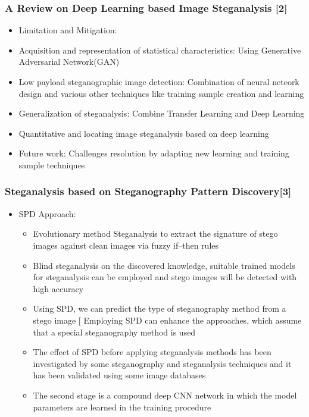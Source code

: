 \documentclass{beamer} %
\theoremstyle{definition} %
\begin{document}
\begin{frame}
\frametitle{A Review on Deep Learning based Image Steganalysis [2]   }
\begin{itemize}
	\item{Limitation and Mitigation:}
\end{itemize}
	\begin{itemize}
		\item {Acquisition and representation of statistical characteristics: Using  Generative Adversarial Network(GAN)  }
		\item {Low payload steganographic image detection: Combination of neural neteork design and various other techniques like training sample creation and learning }
		\item {Generalization of steganalysis: Combine Transfer Learning and Deep Learning}
		\item {Quantitative and locating image steganalysis based on
			deep learning }
	\end{itemize}
\begin{itemize}
	\item{Future work: Challenges resolution by adapting new learning and training sample techniques  }
\end{itemize}
\end{frame}

\begin{frame}
\frametitle{Steganalysis based on Steganography Pattern Discovery[3] }
\begin{itemize}
	\item SPD Approach:
	\begin{itemize}
		\item Evolutionary method Steganalysis to extract the signature of stego images against clean images via fuzzy if–then rules  
		
		\item Blind steganalysis on the discovered knowledge, suitable trained models for steganalysis can be employed and stego images will be detected with high accuracy   
		\item Using SPD, we can predict the type of steganography method from a stego image [  Employing SPD can enhance the approaches, which
		assume that a special steganography method is used 
		\item The effect of SPD before applying steganalysis methods has been investigated by some steganography and steganalysis techniques and it has been validated using some image databases  
		\item The second stage is a compound deep CNN network in which the model parameters are learned in the training procedure 
	\end{itemize}
\end{itemize}
\end{frame}
\end{document}
